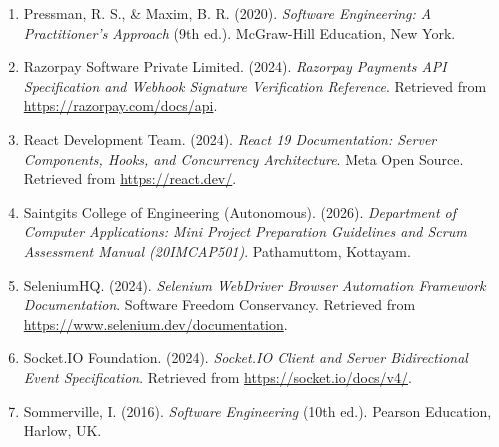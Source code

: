 \documentclass[12pt,a4paper,oneside]{report}
\begin{document}
\begin{singlespace}
\begin{enumerate}[leftmargin=0.35in, itemsep=6pt]
  \item Pressman, R. S., \& Maxim, B. R. (2020). \textit{Software Engineering: A Practitioner's Approach} (9th ed.). McGraw-Hill Education, New York.
  \item Razorpay Software Private Limited. (2024). \textit{Razorpay Payments API Specification and Webhook Signature Verification Reference}. Retrieved from \url{https://razorpay.com/docs/api}.
  \item React Development Team. (2024). \textit{React 19 Documentation: Server Components, Hooks, and Concurrency Architecture}. Meta Open Source. Retrieved from \url{https://react.dev/}.
  \item Saintgits College of Engineering (Autonomous). (2026). \textit{Department of Computer Applications: Mini Project Preparation Guidelines and Scrum Assessment Manual (20IMCAP501)}. Pathamuttom, Kottayam.
  \item SeleniumHQ. (2024). \textit{Selenium WebDriver Browser Automation Framework Documentation}. Software Freedom Conservancy. Retrieved from \url{https://www.selenium.dev/documentation}.
  \item Socket.IO Foundation. (2024). \textit{Socket.IO Client and Server Bidirectional Event Specification}. Retrieved from \url{https://socket.io/docs/v4/}.
  \item Sommerville, I. (2016). \textit{Software Engineering} (10th ed.). Pearson Education, Harlow, UK.
\end{enumerate}
\end{singlespace}
\end{document}
